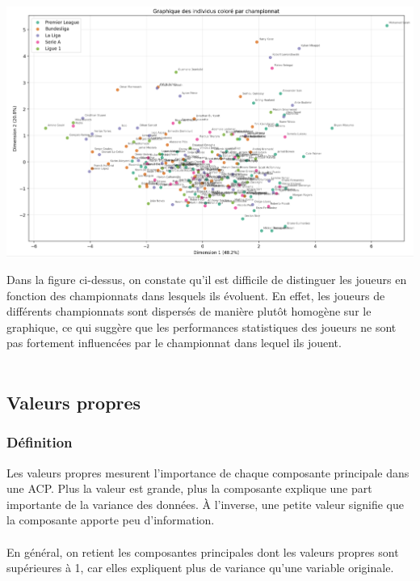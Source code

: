 \documentclass[12pt]{scrartcl}
\begin{document}
                \begin{center}
                    \includegraphics[width=1\textwidth]{images/graphique_des_individus_championnats.png}
                \end{center}

                Dans la figure ci-dessus, on constate qu'il est difficile de distinguer les joueurs en fonction des championnats dans lesquels ils évoluent. En effet, les joueurs de différents championnats sont dispersés de manière plutôt homogène sur le graphique, ce qui suggère que les performances statistiques des joueurs ne sont pas fortement influencées par le championnat dans lequel ils jouent.\\\\



        \subsection{Valeurs propres}
            \subsubsection{Définition}
                Les valeurs propres mesurent l’importance de chaque composante principale dans une ACP. Plus la valeur est grande, plus la composante explique une part importante de la variance des données. À l’inverse, une petite valeur signifie que la composante apporte peu d’information.\\\\
                En général, on retient les composantes principales dont les valeurs propres sont supérieures à 1, car elles expliquent plus de variance qu’une variable originale.
\end{document}
